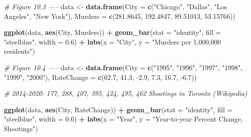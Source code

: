 \documentclass[
]{book}
\newenvironment{Shaded}{\begin{snugshade}}{\end{snugshade}}
\newcommand{\CommentTok}[1]{\textcolor[rgb]{0.56,0.35,0.01}{\textit{#1}}}
\newcommand{\DataTypeTok}[1]{\textcolor[rgb]{0.13,0.29,0.53}{#1}}
\newcommand{\FloatTok}[1]{\textcolor[rgb]{0.00,0.00,0.81}{#1}}
\newcommand{\KeywordTok}[1]{\textcolor[rgb]{0.13,0.29,0.53}{\textbf{#1}}}
\newcommand{\NormalTok}[1]{#1}
\newcommand{\OperatorTok}[1]{\textcolor[rgb]{0.81,0.36,0.00}{\textbf{#1}}}
\newcommand{\StringTok}[1]{\textcolor[rgb]{0.31,0.60,0.02}{#1}}
\begin{document}
\begin{Shaded}
\begin{Highlighting}[]
{\CommentTok{# Figure 10.3 -----}
\NormalTok{data <-}\StringTok{ }\KeywordTok{data.frame}\NormalTok{(}\DataTypeTok{City =} \KeywordTok{c}\NormalTok{(}\StringTok{"Chicago"}\NormalTok{, }\StringTok{"Dallas"}\NormalTok{, }\StringTok{"Los Angeles"}\NormalTok{, }\StringTok{"New York"}\NormalTok{), }
                   \DataTypeTok{Murders =} \KeywordTok{c}\NormalTok{(}\FloatTok{281.8645}\NormalTok{, }\FloatTok{192.4847}\NormalTok{, }\FloatTok{89.51013}\NormalTok{, }\FloatTok{53.15766}\NormalTok{)) }

\KeywordTok{ggplot}\NormalTok{(data, }\KeywordTok{aes}\NormalTok{(City, Murders)) }\OperatorTok{+}\StringTok{ }
\StringTok{  }\KeywordTok{geom_bar}\NormalTok{(}\DataTypeTok{stat =} \StringTok{"identity"}\NormalTok{, }\DataTypeTok{fill =} \StringTok{"steelblue"}\NormalTok{, }\DataTypeTok{width =} \FloatTok{0.6}\NormalTok{) }\OperatorTok{+}\StringTok{ }
\StringTok{  }\KeywordTok{labs}\NormalTok{(}\DataTypeTok{x =} \StringTok{"City"}\NormalTok{, }\DataTypeTok{y =} \StringTok{"Murders per 1,000,000 residents"}\NormalTok{)}

\CommentTok{# Figure 10.4 -----}
\NormalTok{data <-}\StringTok{ }\KeywordTok{data.frame}\NormalTok{(}\DataTypeTok{City =} \KeywordTok{c}\NormalTok{(}\StringTok{"1995"}\NormalTok{, }\StringTok{"1996"}\NormalTok{, }\StringTok{"1997"}\NormalTok{, }\StringTok{"1998"}\NormalTok{, }\StringTok{"1999"}\NormalTok{, }\StringTok{"2000"}\NormalTok{), }
                   \DataTypeTok{RateChange =} \KeywordTok{c}\NormalTok{(}\FloatTok{62.7}\NormalTok{, }\FloatTok{41.3}\NormalTok{, }\FloatTok{-2.9}\NormalTok{, }\FloatTok{7.3}\NormalTok{, }\FloatTok{16.7}\NormalTok{, }\FloatTok{-6.7}\NormalTok{)) }

\CommentTok{# 2014-2020: 177, 288, 407, 395, 424, 495, 462 Shootings in Toronto (Wikipedia)}

\KeywordTok{ggplot}\NormalTok{(data, }\KeywordTok{aes}\NormalTok{(City, RateChange)) }\OperatorTok{+}\StringTok{ }
\StringTok{  }\KeywordTok{geom_bar}\NormalTok{(}\DataTypeTok{stat =} \StringTok{"identity"}\NormalTok{, }\DataTypeTok{fill =} \StringTok{"steelblue"}\NormalTok{, }\DataTypeTok{width =} \FloatTok{0.6}\NormalTok{) }\OperatorTok{+}\StringTok{ }
\StringTok{  }\KeywordTok{labs}\NormalTok{(}\DataTypeTok{x =} \StringTok{"Year"}\NormalTok{, }\DataTypeTok{y =} \StringTok{"Year-to-year Percent Change, Shootings"}\NormalTok{)}

}
\end{Highlighting}
\end{Shaded}
\end{document}
